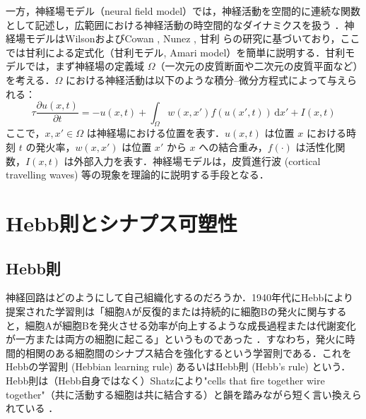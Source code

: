 \documentclass[titlepage]{ltjsbook}
\begin{document}
一方，神経場モデル（neural field model）では，神経活動を空間的に連続な関数として記述し，広範囲における神経活動の時空間的なダイナミクスを扱う \citep{coombes2014tutorial, cook2022neural}．神経場モデルはWilsonおよびCowan \citep{wilson1973mathematical}, Nunez \citep{nunez1974brain}, 甘利 \citep{amari1975homogeneous, amari1977dynamics} らの研究に基づいており，ここでは甘利による定式化（甘利モデル, Amari model）を簡単に説明する．甘利モデルでは，まず神経場の定義域 $\Omega$（一次元の皮質断面や二次元の皮質平面など）を考える．$\Omega$ における神経活動は以下のような積分–微分方程式によって与えられる：
\begin{equation}
\tau \frac{\partial u(x,t)}{\partial t} = -u(x,t) + \int_{\Omega} w(x, x') f(u(x', t))\,\mathrm{d}x' + I(x,t)
\end{equation}
ここで，$x, x' \in \Omega$ は神経場における位置を表す．$u(x,t)$ は位置 $x$ における時刻 $t$ の発火率，$w(x,x')$ は位置 $x'$ から $x$ への結合重み，$f(\cdot)$ は活性化関数，$I(x,t)$ は外部入力を表す．神経場モデルは，皮質進行波 (cortical travelling waves) \citep{muller2018cortical}等の現象を理論的に説明する手段となる．

\section{Hebb則とシナプス可塑性}
\subsection{Hebb則}
神経回路はどのようにして自己組織化するのだろうか．1940年代にHebbにより提案された学習則は「細胞Aが反復的または持続的に細胞Bの発火に関与すると，細胞Aが細胞Bを発火させる効率が向上するような成長過程または代謝変化が一方または両方の細胞に起こる」というものであった \citep{Hebb1949-iv}．すなわち，発火に時間的相関のある細胞間のシナプス結合を強化するという学習則である．これをHebbの学習則 (Hebbian learning rule) あるいはHebb則 (Hebb's rule) という．Hebb則は（Hebb自身ではなく）Shatzにより"cells that fire together wire together"（共に活動する細胞は共に結合する）と韻を踏みながら短く言い換えられている \citep{Shatz1992-he}．
\end{document}
